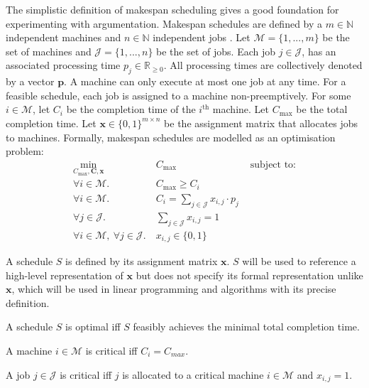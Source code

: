 The simplistic definition of makespan scheduling gives a good foundation for experimenting with argumentation. Makespan schedules are defined by a $m\in\mathbb{N}$ independent machines and $n\in\mathbb{N}$ independent jobs \cite{sa}. Let $\mathcal{M}=\{1,...,m\}$ be the set of machines and $\mathcal{J}=\{1,...,n\}$ be the set of jobs. Each job $j\in\mathcal{J}$, has an associated processing time $p_j\in\mathbb{R}_{\geq 0}$. All processing times are collectively denoted by a vector $\mathbf{p}$. A machine can only execute at most one job at any time. For a feasible schedule, each job is assigned to a machine non-preemptively. For some $i\in\mathcal{M}$, let $C_i$ be the completion time of the $i^\text{th}$ machine. Let $C_{\max}$ be the total completion time. Let $\mathbf{x}\in\{0,1\}^{m\times n}$ be the assignment matrix that allocates jobs to machines. Formally, makespan schedules are modelled as an optimisation problem:
\begin{align*}
	\min_{C_{\max},\mathbf{C},\mathbf{x}}\ &C_{\max}&\text{ subject to:}\\
	\forall i\in\mathcal{M}.\ &C_{\max}\geq C_i\\
	\forall i\in\mathcal{M}.\ &C_i=\sum_{j\in\mathcal{J}}x_{i,j}\cdot p_j\\
	\forall j\in\mathcal{J}.\ &\sum_{j\in\mathcal{J}}x_{i,j}=1\\
	\forall i\in\mathcal{M},\ \forall j\in\mathcal{J}.\ &x_{i,j}\in\{0,1\}
\end{align*}

\begin{definition}
	\label{assignmentmatrix}
	
	A schedule $S$ is defined by its assignment matrix $\mathbf{x}$. $S$ will be used to reference a high-level representation of $\mathbf{x}$ but does not specify its formal representation unlike $\mathbf{x}$, which will be used in linear programming and algorithms with its precise definition.
\end{definition}

\begin{definition}
	A schedule $S$ is optimal iff $S$ feasibly achieves the minimal total completion time.
\end{definition}

\begin{definition}
	A machine $i\in\mathcal{M}$ is critical iff $C_i=C_{max}$.
\end{definition}

\begin{definition}
	A job $j\in\mathcal{J}$ is critical iff $j$ is allocated to a critical machine $i\in\mathcal{M}$ and $x_{i,j}=1$.
\end{definition}

